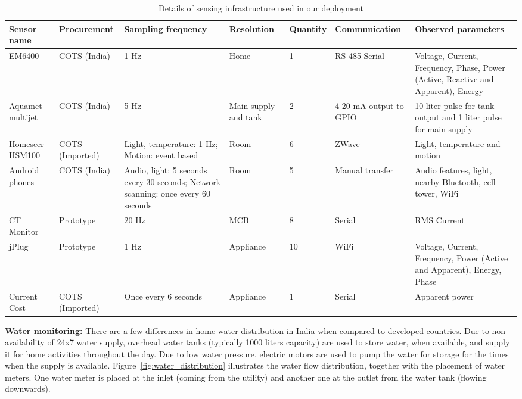 \documentclass[10pt]{sensys-proc}
\newcommand{\figref}[1]{Figure~\ref{#1}}
\begin{document}
\begin{table}[t!]
\footnotesize
\centering
\vspace{-4mm}
\caption{Details of sensing infrastructure used in our deployment}
\vspace{-4mm}
\label{tab:sensing}
\tabcolsep=0.015cm
\begin{center}
\begin{tabular}{|p{1.7cm}|p{2.0cm}|p{3.3cm}|p{1.5cm}|p{1.5cm}|p{2.0cm}|p{5.2cm}|}
\hline
\textbf{Sensor name} & \textbf{Procurement} & \textbf{Sampling frequency} & \textbf{Resolution} & \textbf{Quantity} & \textbf{Communication} & \textbf{Observed parameters}\\
\hline

EM6400& COTS (India)&1 Hz&Home&1&RS 485 Serial&Voltage, Current, Frequency, Phase, Power (Active, Reactive and Apparent), Energy\\ \hline
Aquamet multijet & COTS (India) &5 Hz&Main supply and tank&2&4-20 mA output to GPIO &10 liter pulse for tank output and 1 liter pulse for main supply\\ \hline
Homeseer HSM100 &COTS (Imported)&Light, temperature: 1 Hz; Motion: event based &Room &6&ZWave&Light, temperature and motion\\ \hline
Android phones &COTS (India) & Audio, light: 5 seconds every 30 seconds; Network scanning: once every 60 seconds&Room&5&Manual transfer&Audio features, light, nearby Bluetooth, cell-tower, WiFi\\ \hline
CT Monitor&Prototype &20 Hz&MCB&8&Serial&RMS Current \\\hline
jPlug& Prototype &1 Hz &Appliance&10&WiFi&Voltage, Current, Frequency, Power (Active and Apparent), Energy, Phase\\ \hline	
Current Cost&COTS (Imported)& Once every 6 seconds &Appliance&1&Serial&Apparent power\\ \hline
\end{tabular}
\end{center}
\vspace{-4mm}
\end{table}

\noindent \textbf{Water monitoring:} There are a few differences in home water distribution in India when compared to developed countries. Due to non availability of 24x7 water supply, overhead water tanks (typically 1000 liters capacity) are used to store water, when available, and supply it for home activities throughout the day. Due to low water pressure, electric motors are used to pump the water for storage for the times when the supply is available. %
\figref{fig:water_distribution} illustrates the water flow distribution, together with the placement of water meters. One water meter is placed at the inlet (coming from the utility) and another one at the outlet from the water tank (flowing downwards). %
\end{document}
